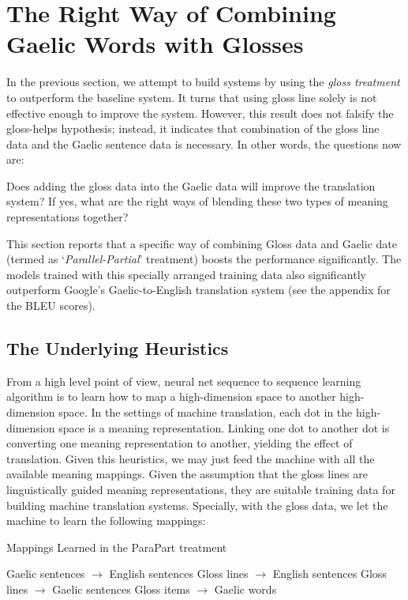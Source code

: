 \documentclass[11pt,a4paper]{article}
\begin{document}
\section{The Right Way of Combining Gaelic Words with Glosses}\label{gd_plus_gl_to_en}
In the previous section, we attempt to build systems by using the \textit{gloss treatment} to outperform the baseline system. It turns that using gloss line solely is not effective enough to improve the system. However, this result does not falsify the gloss-helps hypothesis; instead, it indicates that combination of the gloss line data and the Gaelic sentence data is necessary. In other words, the questions now are: 
\begin{exe}
	\ex 
	\begin{xlist}
		\ex Does adding the gloss data into the Gaelic data will improve the translation system? 
		\ex If yes, what are the right ways of blending these two types of meaning representations together? 
	\end{xlist}	
\end{exe}

This section reports that a specific way of combining Gloss data and Gaelic date (termed as `\textit{Parallel-Partial}' treatment) boosts the performance significantly. The models trained with this specially arranged training data also significantly outperform Google's Gaelic-to-English translation system (see the appendix for the BLEU scores).

\subsection{The Underlying Heuristics}\label{heuristics}
From a high level point of view, neural net sequence to sequence learning algorithm is to learn how to map a high-dimension space to another high-dimension space. In the settings of machine translation, each dot in the high-dimension space is a meaning representation. Linking one dot to another dot is converting one meaning representation to another, yielding the effect of translation. Given this heuristics, we may just feed the machine with all the available meaning mappings. Given the assumption that the gloss lines are linguistically guided meaning representations, they are suitable training data for building machine translation systems. Specially, with the gloss data, we let the machine to learn the following mappings:

\begin{exe}
	\ex Mappings Learned in the ParaPart treatment
	\begin{xlist}
		\ex Gaelic sentences $\rightarrow$ English sentences
		\ex Gloss lines $\rightarrow$ English sentences
		\ex Gloss lines $\rightarrow$ Gaelic sentences
		\ex Gloss items $\rightarrow$ Gaelic words
	\end{xlist}	
\end{exe}    
\end{document}
